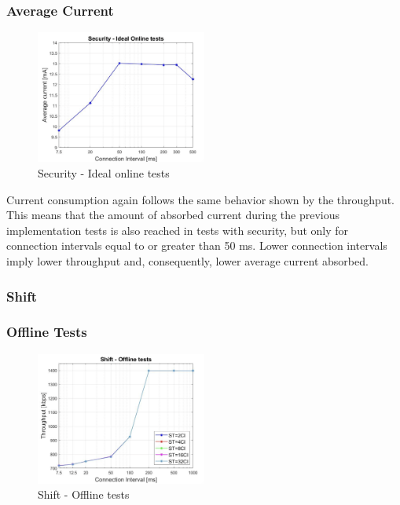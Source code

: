 \documentclass{Configuration_Files/PoliMi3i_thesis}
\begin{document}
\subsubsection*{Average Current}

\begin{figure}[H]
    \centering
    \includegraphics[width=0.5\textwidth]{Results Manuel/figure13}
    \caption{Security - Ideal online tests}
    \label{manuel_results_13}
\end{figure}

Current consumption again follows the same behavior shown by the throughput. This means that the amount of absorbed current during the previous implementation tests is also reached in tests with security, but only for connection intervals equal to or greater than 50 ms. Lower connection intervals imply lower throughput and, consequently, lower average current absorbed.

\subsubsection*{Shift}

\subsubsection*{Offline Tests}

\begin{figure}[H]
    \centering
    \includegraphics[width=0.5\textwidth]{Results Manuel/figure14}
    \caption{Shift - Offline tests}
    \label{manuel_results_14}
\end{figure}
\end{document}
